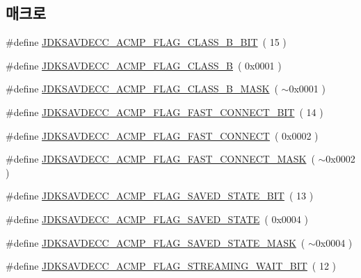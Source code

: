 \subsection*{매크로}
\begin{DoxyCompactItemize}
\item 
\#define \hyperlink{group__acmp__flag_ga270122c5874176771eed04c054cd92c1}{J\+D\+K\+S\+A\+V\+D\+E\+C\+C\+\_\+\+A\+C\+M\+P\+\_\+\+F\+L\+A\+G\+\_\+\+C\+L\+A\+S\+S\+\_\+\+B\+\_\+\+B\+IT}~( 15 )
\item 
\#define \hyperlink{group__acmp__flag_ga0dc8b9996f983ee328a6adce30f48d9c}{J\+D\+K\+S\+A\+V\+D\+E\+C\+C\+\_\+\+A\+C\+M\+P\+\_\+\+F\+L\+A\+G\+\_\+\+C\+L\+A\+S\+S\+\_\+B}~( 0x0001 )
\item 
\#define \hyperlink{group__acmp__flag_ga54bcb31b239c41aa59ecde3999f0222f}{J\+D\+K\+S\+A\+V\+D\+E\+C\+C\+\_\+\+A\+C\+M\+P\+\_\+\+F\+L\+A\+G\+\_\+\+C\+L\+A\+S\+S\+\_\+\+B\+\_\+\+M\+A\+SK}~( $\sim$0x0001 )
\item 
\#define \hyperlink{group__acmp__flag_gaefc85d103624e47fffa45cf7cf7f84c9}{J\+D\+K\+S\+A\+V\+D\+E\+C\+C\+\_\+\+A\+C\+M\+P\+\_\+\+F\+L\+A\+G\+\_\+\+F\+A\+S\+T\+\_\+\+C\+O\+N\+N\+E\+C\+T\+\_\+\+B\+IT}~( 14 )
\item 
\#define \hyperlink{group__acmp__flag_ga42d12f07fda51ec3d1a78908444c5f6a}{J\+D\+K\+S\+A\+V\+D\+E\+C\+C\+\_\+\+A\+C\+M\+P\+\_\+\+F\+L\+A\+G\+\_\+\+F\+A\+S\+T\+\_\+\+C\+O\+N\+N\+E\+CT}~( 0x0002 )
\item 
\#define \hyperlink{group__acmp__flag_ga0ba0387a31d21cff9a75a6099e1e8128}{J\+D\+K\+S\+A\+V\+D\+E\+C\+C\+\_\+\+A\+C\+M\+P\+\_\+\+F\+L\+A\+G\+\_\+\+F\+A\+S\+T\+\_\+\+C\+O\+N\+N\+E\+C\+T\+\_\+\+M\+A\+SK}~( $\sim$0x0002 )
\item 
\#define \hyperlink{group__acmp__flag_ga9d54d40196126750e026ba86cd693055}{J\+D\+K\+S\+A\+V\+D\+E\+C\+C\+\_\+\+A\+C\+M\+P\+\_\+\+F\+L\+A\+G\+\_\+\+S\+A\+V\+E\+D\+\_\+\+S\+T\+A\+T\+E\+\_\+\+B\+IT}~( 13 )
\item 
\#define \hyperlink{group__acmp__flag_ga23785c8b8fa4d5a7caaad0f82b8df03a}{J\+D\+K\+S\+A\+V\+D\+E\+C\+C\+\_\+\+A\+C\+M\+P\+\_\+\+F\+L\+A\+G\+\_\+\+S\+A\+V\+E\+D\+\_\+\+S\+T\+A\+TE}~( 0x0004 )
\item 
\#define \hyperlink{group__acmp__flag_ga24a2d851f27413c1613703a255872a5a}{J\+D\+K\+S\+A\+V\+D\+E\+C\+C\+\_\+\+A\+C\+M\+P\+\_\+\+F\+L\+A\+G\+\_\+\+S\+A\+V\+E\+D\+\_\+\+S\+T\+A\+T\+E\+\_\+\+M\+A\+SK}~( $\sim$0x0004 )
\item 
\#define \hyperlink{group__acmp__flag_ga886df46480b43b9b120af9fbac0640af}{J\+D\+K\+S\+A\+V\+D\+E\+C\+C\+\_\+\+A\+C\+M\+P\+\_\+\+F\+L\+A\+G\+\_\+\+S\+T\+R\+E\+A\+M\+I\+N\+G\+\_\+\+W\+A\+I\+T\+\_\+\+B\+IT}~( 12 )

\end{DoxyCompactItemize}
